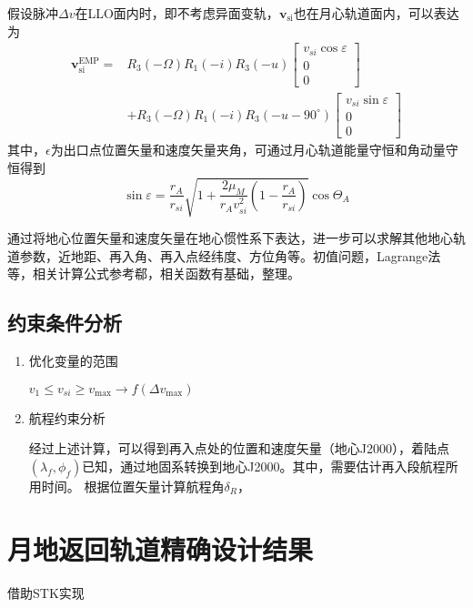 假设脉冲$ \Delta v $在LLO面内时，即不考虑异面变轨，$ \bm{v}_\mathrm{si}  $也在月心轨道面内，可以表达为
\begin{equation}
	\begin{aligned}
		\boldsymbol{v}_{\mathrm{si}}^{\mathrm{EMP}}= & R_{3}(-\Omega) R_{1}(-i) R_{3}(-u)  \left[\begin{array}{c}
				v_{s i} \cos \varepsilon \\
				0                        \\
				0
			\end{array}\right]                      \\
		{}                            & +R_{3}(-\Omega) R_{1}(-i) R_{3}\left(-u-90^{\circ}\right)\left[\begin{array}{c}
				v_{s i} \sin \varepsilon \\
				0                        \\
				0
			\end{array}\right]
	\end{aligned}
\end{equation}
其中，$ \epsilon $为出口点位置矢量和速度矢量夹角，可通过月心轨道能量守恒和角动量守恒得到
\begin{equation}\sin \varepsilon=\frac{r_{A}}{r_{s i}} \sqrt{1+\frac{2 \mu_{M}}{r_{A} v_{s i}^{2}}\left(1-\frac{r_{A}}{r_{s i}}\right)} \cos \Theta_{A}\end{equation}

通过将地心位置矢量和速度矢量在地心惯性系下表达，进一步可以求解其他地心轨道参数，近地距、再入角、再入点经纬度、方位角等。初值问题，Lagrange法等，相关计算公式参考郗，相关函数有基础，整理。

\subsection{约束条件分析}
\begin{enumerate}
	\item 优化变量的范围
	
	$ v_1 \leq v_{si} \geq v_{\max} \to f(\Delta v_{\max})$
	\item 航程约束分析

		经过上述计算，可以得到再入点处的位置和速度矢量（地心J2000），着陆点$ (\lambda_f,\phi_f) $已知，通过地固系转换到地心J2000。其中，需要估计再入段航程所用时间。
		根据位置矢量计算航程角$ \delta_R $，
\end{enumerate}
\section{月地返回轨道精确设计结果}
借助STK实现